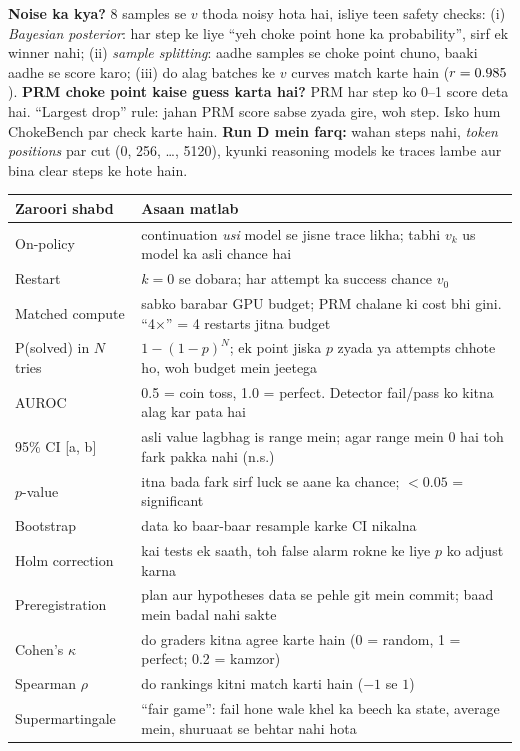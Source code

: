 \documentclass[10pt,a4paper]{article}
\begin{document}
\textbf{Noise ka kya?} 8 samples se $v$ thoda noisy hota hai, isliye teen safety checks:
(i) \emph{Bayesian posterior}: har step ke liye ``yeh choke point hone ka probability'', sirf ek winner nahi;
(ii) \emph{sample splitting}: aadhe samples se choke point chuno, baaki aadhe se score karo;
(iii) do alag batches ke $v$ curves match karte hain ($r=0.985$).
\textbf{PRM choke point kaise guess karta hai?} PRM har step ko 0--1 score deta hai. ``Largest drop'' rule:
jahan PRM score sabse zyada gire, woh step. Isko hum ChokeBench par check karte hain.
\textbf{Run D mein farq:} wahan steps nahi, \emph{token positions} par cut (0, 256, \dots, 5120), kyunki reasoning
models ke traces lambe aur bina clear steps ke hote hain.

\begin{center}\small
\begin{tabularx}{\textwidth}{lX}
\toprule
Zaroori shabd & Asaan matlab \\
\midrule
On-policy & continuation \emph{usi} model se jisne trace likha; tabhi $v_k$ us model ka asli chance hai \\
Restart & $k=0$ se dobara; har attempt ka success chance $v_0$ \\
Matched compute & sabko barabar GPU budget; PRM chalane ki cost bhi gini. ``4$\times$'' = 4 restarts jitna budget \\
P(solved) in $N$ tries & $1-(1-p)^N$; ek point jiska $p$ zyada ya attempts chhote ho, woh budget mein jeetega \\
AUROC & 0.5 = coin toss, 1.0 = perfect. Detector fail/pass ko kitna alag kar pata hai \\
95\% CI [a, b] & asli value lagbhag is range mein; agar range mein 0 hai toh fark pakka nahi (n.s.) \\
$p$-value & itna bada fark sirf luck se aane ka chance; $<0.05$ = significant \\
Bootstrap & data ko baar-baar resample karke CI nikalna \\
Holm correction & kai tests ek saath, toh false alarm rokne ke liye $p$ ko adjust karna \\
Preregistration & plan aur hypotheses data se pehle git mein commit; baad mein badal nahi sakte \\
Cohen's $\kappa$ & do graders kitna agree karte hain (0 = random, 1 = perfect; 0.2 = kamzor) \\
Spearman $\rho$ & do rankings kitni match karti hain ($-1$ se $1$) \\
Supermartingale & ``fair game'': fail hone wale khel ka beech ka state, average mein, shuruaat se behtar nahi hota \\
\bottomrule
\end{tabularx}
\end{center}
\end{document}
